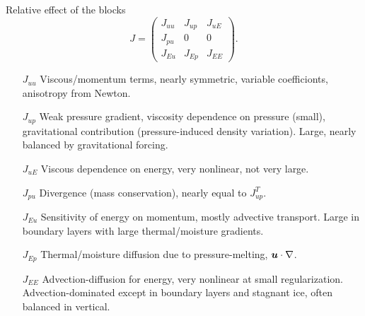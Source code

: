 \begin{frame}{Relative effect of the blocks}
  \begin{equation*}\label{eq:vhtblock}
    J =
    \begin{pmatrix}
      J_{uu} & J_{up} & J_{uE} \\
      J_{pu} & 0 & 0 \\
      J_{Eu} & J_{Ep} & J_{EE}
    \end{pmatrix} .
  \end{equation*}
  \begin{itemize}
  \item[$J_{uu}$] Viscous/momentum terms, nearly symmetric, variable coefficionts, anisotropy from Newton.
  \item[$J_{up}$] Weak pressure gradient, viscosity dependence on pressure (small), gravitational contribution (pressure-induced density variation).
    Large, nearly balanced by gravitational forcing.
  \item[$J_{uE}$] Viscous dependence on energy, very nonlinear, not very large.
  \item[$J_{pu}$] Divergence (mass conservation), nearly equal to $J_{up}^T$.
  \item[$J_{Eu}$] Sensitivity of energy on momentum, mostly advective transport.
    Large in boundary layers with large thermal/moisture gradients.
  \item[$J_{Ep}$] Thermal/moisture diffusion due to pressure-melting, $\bm u \cdot \nabla$.
  \item[$J_{EE}$] Advection-diffusion for energy, very nonlinear at small regularization.
    Advection-dominated except in boundary layers and stagnant ice, often balanced in vertical.
  \end{itemize}
\end{frame}

